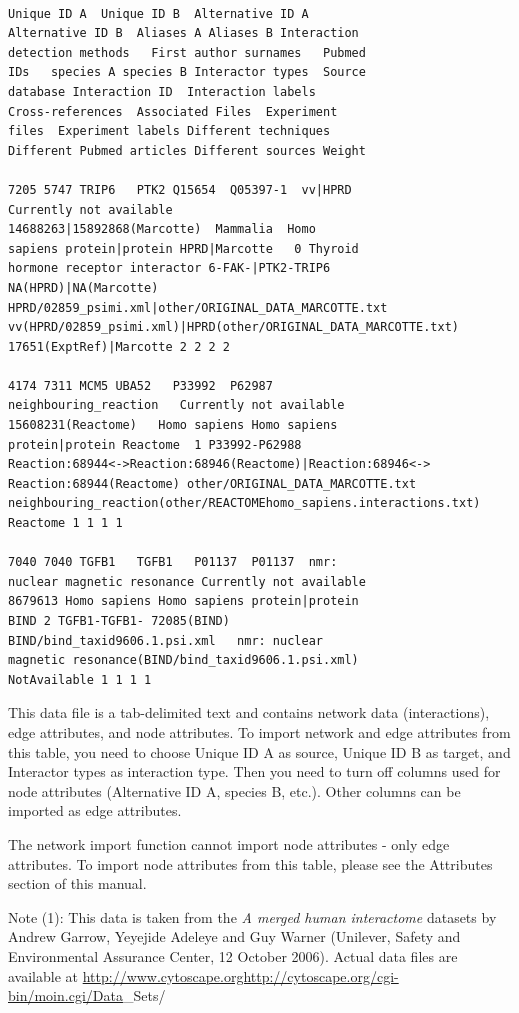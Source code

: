 \begin{verbatim}

Unique ID A  Unique ID B  Alternative ID A
Alternative ID B  Aliases A Aliases B Interaction
detection methods   First author surnames   Pubmed
IDs   species A species B Interactor types  Source
database Interaction ID  Interaction labels
Cross-references  Associated Files  Experiment
files  Experiment labels Different techniques
Different Pubmed articles Different sources Weight

7205 5747 TRIP6   PTK2 Q15654  Q05397-1  vv|HPRD
Currently not available
14688263|15892868(Marcotte)  Mammalia  Homo
sapiens protein|protein HPRD|Marcotte   0 Thyroid
hormone receptor interactor 6-FAK-|PTK2-TRIP6
NA(HPRD)|NA(Marcotte)
HPRD/02859_psimi.xml|other/ORIGINAL_DATA_MARCOTTE.txt
vv(HPRD/02859_psimi.xml)|HPRD(other/ORIGINAL_DATA_MARCOTTE.txt)
17651(ExptRef)|Marcotte 2 2 2 2

4174 7311 MCM5 UBA52   P33992  P62987
neighbouring_reaction   Currently not available
15608231(Reactome)   Homo sapiens Homo sapiens
protein|protein Reactome  1 P33992-P62988
Reaction:68944<->Reaction:68946(Reactome)|Reaction:68946<->
Reaction:68944(Reactome) other/ORIGINAL_DATA_MARCOTTE.txt
neighbouring_reaction(other/REACTOMEhomo_sapiens.interactions.txt)
Reactome 1 1 1 1

7040 7040 TGFB1   TGFB1   P01137  P01137  nmr:
nuclear magnetic resonance Currently not available
8679613 Homo sapiens Homo sapiens protein|protein
BIND 2 TGFB1-TGFB1- 72085(BIND)
BIND/bind_taxid9606.1.psi.xml   nmr: nuclear
magnetic resonance(BIND/bind_taxid9606.1.psi.xml)
NotAvailable 1 1 1 1

\end{verbatim}

 This data file is a tab-delimited text and contains network data (interactions), edge attributes, and node attributes. To import network and edge attributes from this table, you need to choose Unique ID A as source, Unique ID B as target, and Interactor types as interaction type. Then you need to turn off columns used for node attributes (Alternative ID A, species B, etc.). Other columns can be imported as edge attributes. 

 The network import function cannot import node attributes - only edge attributes. To import node attributes from this table, please see the Attributes section of this manual. 

 Note (1): This data is taken from the \emph{A merged human interactome}
 datasets by Andrew Garrow, Yeyejide Adeleye and Guy Warner (Unilever, Safety and Environmental Assurance Center, 12 October 2006). Actual data files are available at \url{http://www.cytoscape.orghttp://cytoscape.org/cgi-bin/moin.cgi/Data}\_Sets/
 
